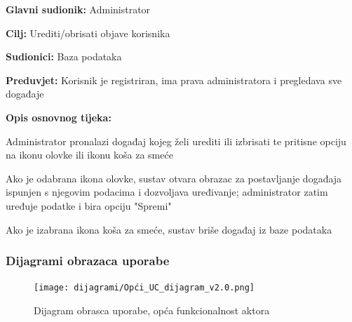 \noindent {}
\begin{packed_item}
	\item \textbf{Glavni sudionik:} Administrator
	\item  \textbf{Cilj:} Urediti/obrisati objave korisnika
	\item  \textbf{Sudionici:} Baza podataka
	\item  \textbf{Preduvjet:} Korisnik je registriran, ima prava administratora i pregledava sve događaje
	\item  \textbf{Opis osnovnog tijeka:}
	
	\item[] \begin{packed_enum}
		
		\item Administrator pronalazi događaj kojeg želi urediti ili izbrisati te pritisne opciju na ikonu olovke ili ikonu koša za smeće
		\item Ako je odabrana ikona olovke, sustav otvara obrazac za postavljanje događaja ispunjen s njegovim podacima i dozvoljava uređivanje; administrator zatim uređuje podatke i bira opciju "Spremi"
		\item Ako je izabrana ikona koša za smeće, sustav briše događaj iz baze podataka
	\end{packed_enum}
	
\end{packed_item}



					
				\subsubsection{Dijagrami obrazaca uporabe}
					
					\begin{figure}[H]
						\texttt{[image: dijagrami/Opći\_UC\_dijagram\_v2.0.png]} %
						\centering
						\caption{Dijagram obrasca uporabe, opća funkcionalnost aktora}
						\label{fig:promjene}
					\end{figure}
					
